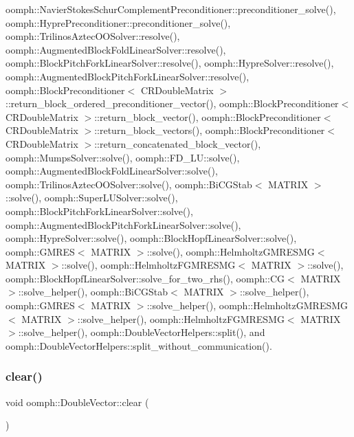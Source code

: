 oomph\+::\+Navier\+Stokes\+Schur\+Complement\+Preconditioner\+::preconditioner\+\_\+solve(), oomph\+::\+Hypre\+Preconditioner\+::preconditioner\+\_\+solve(), oomph\+::\+Trilinos\+Aztec\+O\+O\+Solver\+::resolve(), oomph\+::\+Augmented\+Block\+Fold\+Linear\+Solver\+::resolve(), oomph\+::\+Block\+Pitch\+Fork\+Linear\+Solver\+::resolve(), oomph\+::\+Hypre\+Solver\+::resolve(), oomph\+::\+Augmented\+Block\+Pitch\+Fork\+Linear\+Solver\+::resolve(), oomph\+::\+Block\+Preconditioner$<$ C\+R\+Double\+Matrix $>$\+::return\+\_\+block\+\_\+ordered\+\_\+preconditioner\+\_\+vector(), oomph\+::\+Block\+Preconditioner$<$ C\+R\+Double\+Matrix $>$\+::return\+\_\+block\+\_\+vector(), oomph\+::\+Block\+Preconditioner$<$ C\+R\+Double\+Matrix $>$\+::return\+\_\+block\+\_\+vectors(), oomph\+::\+Block\+Preconditioner$<$ C\+R\+Double\+Matrix $>$\+::return\+\_\+concatenated\+\_\+block\+\_\+vector(), oomph\+::\+Mumps\+Solver\+::solve(), oomph\+::\+F\+D\+\_\+\+L\+U\+::solve(), oomph\+::\+Augmented\+Block\+Fold\+Linear\+Solver\+::solve(), oomph\+::\+Trilinos\+Aztec\+O\+O\+Solver\+::solve(), oomph\+::\+Bi\+C\+G\+Stab$<$ M\+A\+T\+R\+I\+X $>$\+::solve(), oomph\+::\+Super\+L\+U\+Solver\+::solve(), oomph\+::\+Block\+Pitch\+Fork\+Linear\+Solver\+::solve(), oomph\+::\+Augmented\+Block\+Pitch\+Fork\+Linear\+Solver\+::solve(), oomph\+::\+Hypre\+Solver\+::solve(), oomph\+::\+Block\+Hopf\+Linear\+Solver\+::solve(), oomph\+::\+G\+M\+R\+E\+S$<$ M\+A\+T\+R\+I\+X $>$\+::solve(), oomph\+::\+Helmholtz\+G\+M\+R\+E\+S\+M\+G$<$ M\+A\+T\+R\+I\+X $>$\+::solve(), oomph\+::\+Helmholtz\+F\+G\+M\+R\+E\+S\+M\+G$<$ M\+A\+T\+R\+I\+X $>$\+::solve(), oomph\+::\+Block\+Hopf\+Linear\+Solver\+::solve\+\_\+for\+\_\+two\+\_\+rhs(), oomph\+::\+C\+G$<$ M\+A\+T\+R\+I\+X $>$\+::solve\+\_\+helper(), oomph\+::\+Bi\+C\+G\+Stab$<$ M\+A\+T\+R\+I\+X $>$\+::solve\+\_\+helper(), oomph\+::\+G\+M\+R\+E\+S$<$ M\+A\+T\+R\+I\+X $>$\+::solve\+\_\+helper(), oomph\+::\+Helmholtz\+G\+M\+R\+E\+S\+M\+G$<$ M\+A\+T\+R\+I\+X $>$\+::solve\+\_\+helper(), oomph\+::\+Helmholtz\+F\+G\+M\+R\+E\+S\+M\+G$<$ M\+A\+T\+R\+I\+X $>$\+::solve\+\_\+helper(), oomph\+::\+Double\+Vector\+Helpers\+::split(), and oomph\+::\+Double\+Vector\+Helpers\+::split\+\_\+without\+\_\+communication().

\mbox{\label{classoomph_1_1DoubleVector_af1677445056759263b1b076966e7bfae}} 
\subsubsection{\texorpdfstring{clear()}{clear()}}
{\footnotesize\ttfamily void oomph\+::\+Double\+Vector\+::clear (\begin{DoxyParamCaption}{ }\end{DoxyParamCaption})\hspace{0.3cm}{\ttfamily [inline]}}



